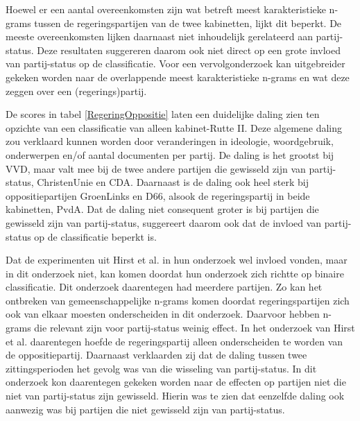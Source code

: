 Hoewel er een aantal overeenkomsten zijn wat betreft meest karakteristieke n-grams tussen de regeringspartijen van de twee kabinetten, lijkt dit beperkt. De meeste overeenkomsten lijken daarnaast niet inhoudelijk gerelateerd aan partij-status. Deze resultaten suggereren daarom ook niet direct op een grote invloed van partij-status op de classificatie. Voor een vervolgonderzoek kan uitgebreider gekeken worden naar de overlappende meest karakteristieke n-grams en wat deze zeggen over een (regerings)partij.\par
De scores in tabel \ref{RegeringOppositie} laten een duidelijke daling zien ten opzichte van een classificatie van alleen kabinet-Rutte II. Deze algemene daling zou verklaard kunnen worden door veranderingen in ideologie, woordgebruik, onderwerpen en/of aantal documenten per partij. De daling is het grootst bij VVD, maar valt mee bij de twee andere partijen die gewisseld zijn van partij-status, ChristenUnie en CDA. Daarnaast is de daling ook heel sterk bij oppositiepartijen GroenLinks en D66, alsook de regeringspartij in beide kabinetten, PvdA. Dat de daling niet consequent groter is bij partijen die gewisseld zijn van partij-status, suggereert daarom ook dat de invloed van partij-status op de classificatie beperkt is.\par
Dat de experimenten uit Hirst et al. in hun onderzoek wel invloed vonden, maar in dit onderzoek niet, kan komen doordat hun onderzoek zich richtte op binaire classificatie. Dit onderzoek daarentegen had meerdere partijen. Zo kan het ontbreken van gemeenschappelijke n-grams komen doordat regeringspartijen zich ook van elkaar moesten onderscheiden in dit onderzoek. Daarvoor hebben n-grams die relevant zijn voor partij-status weinig effect. In het onderzoek van Hirst et al. daarentegen hoefde de regeringspartij alleen onderscheiden te worden van de oppositiepartij. Daarnaast verklaarden zij dat de daling tussen twee zittingsperioden het gevolg was van die wisseling van partij-status. In dit onderzoek kon daarentegen gekeken worden naar de effecten op partijen niet die niet van partij-status zijn gewisseld. Hierin was te zien dat eenzelfde daling ook aanwezig was bij partijen die niet gewisseld zijn van partij-status.\par

